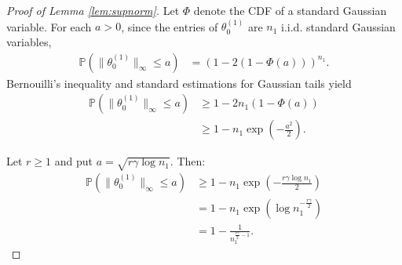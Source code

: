 \documentclass{article}
\theoremstyle{definition}
\theoremstyle{remark}
\numberwithin{equation}{section}
\newcommand{\norm}[2]{
    \|#1\|_{#2}
}
\begin{document}
\begin{proof}[Proof of Lemma \ref{lem:supnorm}]
    Let $\Phi$ denote the CDF of a standard Gaussian variable.
    For each $a>0$, since the entries of $\theta_0^{(1)}$ are $n_1$ i.i.d. standard Gaussian variables,
    \begin{align}
        \mathbb P(\norm{\theta_0^{(1)}}{\infty} \le a) &= (1-2(1-\Phi(a)))^{n_1}.
    \end{align}
    Bernouilli's inequality and standard estimations for Gaussian tails yield
    \begin{align}
        \mathbb P(\norm{\theta_0^{(1)}}{\infty}\le a) &\ge 1 - 2n_1(1-\Phi(a)) \\
        &\ge 1 - n_1\exp\left(-\frac{a^2}{2}\right).
    \end{align}

    Let $r\ge 1$ and put $a = \sqrt{r\gamma \log n_1}$. 
    Then:
    \begin{align}
        \mathbb P(\norm{\theta_0^{(1)}}{\infty}\le a) &\ge 1 - n_1\exp\left(-\frac{r\gamma \log n_1}{2}\right) \\
        &= 1 - n_1\exp\left(\log n_1^{-\frac{r\gamma}{2}}\right)\\
        &= 1 - \frac{1}{n_1^{\frac{r\gamma}{2}-1}}.
    \end{align}

\end{proof}
\end{document}
